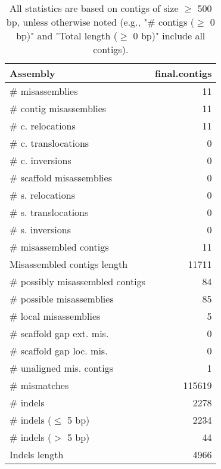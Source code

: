 \documentclass[12pt,a4paper]{article}
\begin{document}
\begin{table}[ht]
\begin{center}
\caption{All statistics are based on contigs of size $\geq$ 500 bp, unless otherwise noted (e.g., "\# contigs ($\geq$ 0 bp)" and "Total length ($\geq$ 0 bp)" include all contigs).}
\begin{tabular}{|l*{1}{|r}|}
\hline
Assembly & final.contigs \\ \hline
\# misassemblies & 11 \\ \hline
\hspace{2mm}\# contig misassemblies & 11 \\ \hline
\hspace{5mm}\# c. relocations & 11 \\ \hline
\hspace{5mm}\# c. translocations & 0 \\ \hline
\hspace{5mm}\# c. inversions & 0 \\ \hline
\hspace{2mm}\# scaffold misassemblies & 0 \\ \hline
\hspace{5mm}\# s. relocations & 0 \\ \hline
\hspace{5mm}\# s. translocations & 0 \\ \hline
\hspace{5mm}\# s. inversions & 0 \\ \hline
\# misassembled contigs & 11 \\ \hline
Misassembled contigs length & 11711 \\ \hline
\# possibly misassembled contigs & 84 \\ \hline
\hspace{5mm}\# possible misassemblies & 85 \\ \hline
\# local misassemblies & 5 \\ \hline
\# scaffold gap ext. mis. & 0 \\ \hline
\# scaffold gap loc. mis. & 0 \\ \hline
\# unaligned mis. contigs & 1 \\ \hline
\# mismatches & 115619 \\ \hline
\# indels & 2278 \\ \hline
\hspace{5mm}\# indels ($\leq$ 5 bp) & 2234 \\ \hline
\hspace{5mm}\# indels ($>$ 5 bp) & 44 \\ \hline
Indels length & 4966 \\ \hline
\end{tabular}
\end{center}
\end{table}
\end{document}
